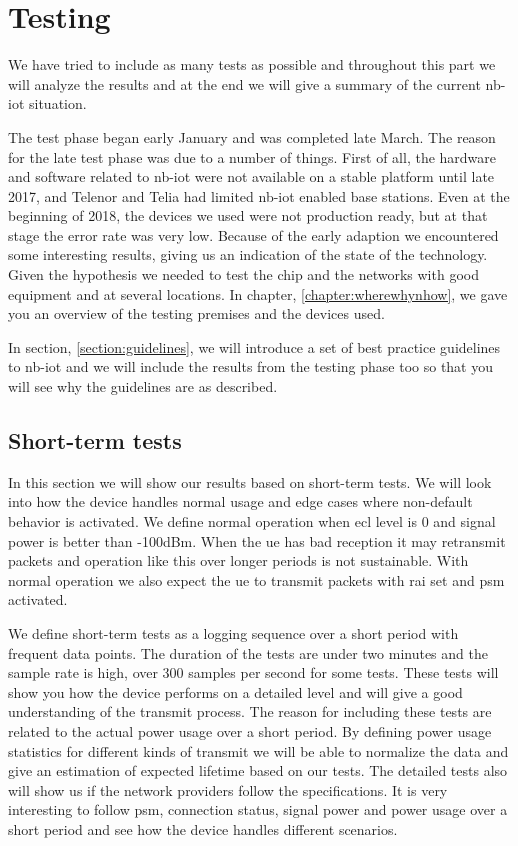 \documentclass[USenglish]{ifimaster}  %
\begin{document}
\chapter{Testing} \label{section:testing}
We have tried to include as many tests as possible and throughout this part we will analyze the results and at the end we will give a summary of the current \acrshort{nb-iot} situation.

The test phase began early January and was completed late March. The reason for the late test phase was due to a number of things. First of all, the hardware and software related to \acrshort{nb-iot} were not available on a stable platform until late 2017, and Telenor and Telia had limited \acrshort{nb-iot} enabled base stations. Even at the beginning of 2018, the devices we used were not production ready, but at that stage the error rate was very low. Because of the early adaption we encountered some interesting results, giving us an indication of the state of the technology. Given the hypothesis we needed to test the chip and the networks with good equipment and at several locations. In chapter, \vref{chapter:wherewhynhow}, we gave you an overview of the testing premises and the devices used.

In section, \vref{section:guidelines}, we will introduce a set of best practice guidelines to \acrshort{nb-iot} and we will include the results from the testing phase too so that you will see why the guidelines are as described.

\section{Short-term tests} \label{section:detailedtest}
In this section we will show our results based on short-term tests. We will look into how the device handles normal usage and edge cases where non-default behavior is activated. We define normal operation when \acrshort{ecl} level is 0 and signal power is better than -100dBm. When the \acrshort{ue} has bad reception it may retransmit packets and operation like this over longer periods is not sustainable. With normal operation we also expect the \acrshort{ue} to transmit packets with \acrshort{rai} set and \acrshort{psm} activated.

We define short-term tests as a logging sequence over a short period with frequent data points. The duration of the tests are under two minutes and the sample rate is high, over 300 samples per second for some tests. These tests will show you how the device performs on a detailed level and will give a good understanding of the transmit process. The reason for including these tests are related to the actual power usage over a short period. By defining power usage statistics for different kinds of transmit we will be able to normalize the data and give an estimation of expected lifetime based on our tests. The detailed tests also will show us if the network providers follow the specifications. It is very interesting to follow \acrshort{psm}, connection status, signal power and power usage over a short period and see how the device handles different scenarios.
\end{document}
